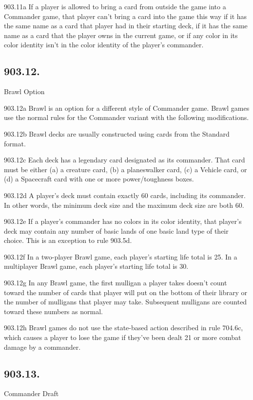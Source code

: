 903.11a If a player is allowed to bring a card from outside the game into a Commander game, that player can’t bring a card into the game this way if it has the same name as a card that player had in their starting deck, if it has the same name as a card that the player owns in the current game, or if any color in its color identity isn’t in the color identity of the player’s commander.

\subsection*{903.12.}
Brawl Option

903.12a Brawl is an option for a different style of Commander game. Brawl games use the normal rules for the Commander variant with the following modifications.

903.12b Brawl decks are usually constructed using cards from the Standard format.

903.12c Each deck has a legendary card designated as its commander. That card must be either (a) a creature card, (b) a planeswalker card, (c) a Vehicle card, or (d) a Spacecraft card with one or more power/toughness boxes.

903.12d A player’s deck must contain exactly 60 cards, including its commander. In other words, the minimum deck size and the maximum deck size are both 60.

903.12e If a player’s commander has no colors in its color identity, that player’s deck may contain any number of basic lands of one basic land type of their choice. This is an exception to rule 903.5d.

903.12f In a two-player Brawl game, each player’s starting life total is 25. In a multiplayer Brawl game, each player’s starting life total is 30.

903.12g In any Brawl game, the first mulligan a player takes doesn’t count toward the number of cards that player will put on the bottom of their library or the number of mulligans that player may take. Subsequent mulligans are counted toward these numbers as normal.

903.12h Brawl games do not use the state-based action described in rule 704.6c, which causes a player to lose the game if they’ve been dealt 21 or more combat damage by a commander.

\subsection*{903.13.}
Commander Draft

